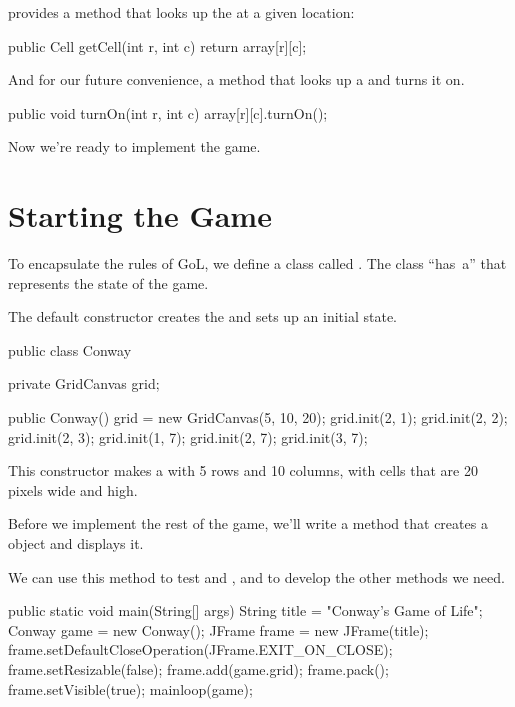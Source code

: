  provides a method that looks up the  at a given location:

\begin{code}
public Cell getCell(int r, int c) {
    return array[r][c];
}
\end{code}

And for our future convenience, a method that looks up a  and turns it on.

\begin{code}
public void turnOn(int r, int c) {
    array[r][c].turnOn();
}
\end{code}

Now we're ready to implement the game.


\section{Starting the Game}
\label{conwaymain}

To encapsulate the rules of GoL, we define a class called .
The  class ``has~a''  that represents the state of the game.

The default constructor creates the  and sets up an initial state.


\begin{code}
public class Conway {
    private GridCanvas grid;

    public Conway() {
        grid = new GridCanvas(5, 10, 20);
        grid.init(2, 1);
        grid.init(2, 2);
        grid.init(2, 3);
        grid.init(1, 7);
        grid.init(2, 7);
        grid.init(3, 7);
    }
}
\end{code}

This constructor makes a  with 5 rows and 10 columns, with cells that are 20 pixels wide and high.


Before we implement the rest of the game, we'll write a  method that creates a  object and displays it.

We can use this method to test  and , and to develop the other methods we need.

\begin{code}
public static void main(String[] args) {
    String title = "Conway's Game of Life";
    Conway game = new Conway();
    JFrame frame = new JFrame(title);
    frame.setDefaultCloseOperation(JFrame.EXIT_ON_CLOSE);
    frame.setResizable(false);
    frame.add(game.grid);
    frame.pack();
    frame.setVisible(true);
    mainloop(game);
}
\end{code}

